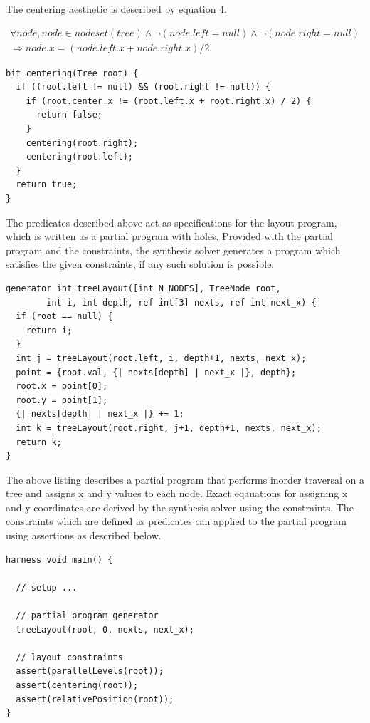 \documentclass{article}
\begin{document}
The centering aesthetic is described by equation 4.

\begin{equation}
  \begin{split}
    \forall node, node \in nodeset(tree) \wedge \neg (node.left = null) \wedge \neg (node.right = null)\\
    \Longrightarrow node.x = (node.left.x + node.right.x) / 2
  \end{split}
\end{equation}

\begin{verbatim}
bit centering(Tree root) {
  if ((root.left != null) && (root.right != null)) {
    if (root.center.x != (root.left.x + root.right.x) / 2) {
      return false;
    }
    centering(root.right);
    centering(root.left);
  }
  return true;
}
\end{verbatim}

The predicates described above act as specifications for the layout
program, which is written as a partial program with holes.  Provided
with the partial program and the constraints, the synthesis solver
generates a program which satisfies the given constraints, if any such
solution is possible.

\begin{verbatim}
generator int treeLayout([int N_NODES], TreeNode root,
		int i, int depth, ref int[3] nexts, ref int next_x) {
  if (root == null) {
    return i;
  }
  int j = treeLayout(root.left, i, depth+1, nexts, next_x);
  point = {root.val, {| nexts[depth] | next_x |}, depth};
  root.x = point[0];
  root.y = point[1];
  {| nexts[depth] | next_x |} += 1;
  int k = treeLayout(root.right, j+1, depth+1, nexts, next_x);
  return k;
} 
\end{verbatim}


The above listing describes a partial program that performs inorder
traversal on a tree and assigns x and y values to each node.  Exact
eqauations for assigning x and y coordinates are derived by the
synthesis solver using the constraints.  The constraints which are
defined as predicates can applied to the partial program using
assertions as described below.

\begin{verbatim}
harness void main() {

  // setup ...

  // partial program generator
  treeLayout(root, 0, nexts, next_x);

  // layout constraints
  assert(parallelLevels(root));
  assert(centering(root));
  assert(relativePosition(root));
}
\end{verbatim}
\end{document}
